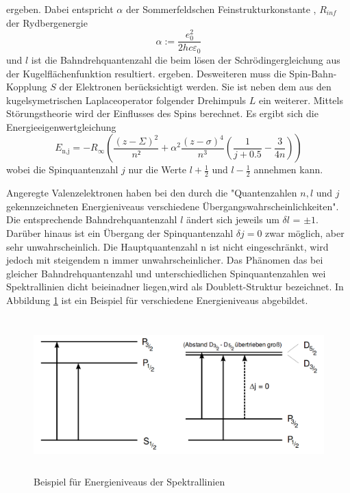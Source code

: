ergeben. Dabei entspricht $\alpha$ der Sommerfeldschen Feinstrukturkonstante , $R_{inf}$ der Rydbergenergie
\begin{equation}
  \alpha := \frac{e_0^2}{2 h c \varepsilon_0}
  \label{eqn:alpha}
\end{equation}
und $l$ ist die Bahndrehquantenzahl die beim lösen der Schrödingergleichung aus der Kugelflächenfunktion resultiert.
ergeben. Desweiteren muss die Spin-Bahn-Kopplung $S$ der Elektronen berücksichtigt werden. Sie ist neben dem aus den kugelsymetrischen Laplaceoperator folgender Drehimpuls $L$ ein weiterer. Mittels Störungstheorie wird der Einflusses des Spins berechnet. Es ergibt sich die Energieeigenwertgleichung
\begin{equation}
  E_\text{n,j} = -R_{\infty}\left( \frac{(z - \Sigma)^2}{n²} + \alpha^2 \frac{(z - \sigma)^4}{n^3} \left( \frac{1}{j + 0.5} - \frac{3}{4n} \right) \right)
  \label{<++>}
\end{equation}
wobei die Spinquantenzahl $j$ nur die Werte $l + \frac{1}{2}$ und $l - \frac{1}{2}$ annehmen kann.

Angeregte Valenzelektronen haben bei den durch die "Quantenzahlen $n ,l$ und $j$ gekennzeichneten Energieniveaus verschiedene Übergangswahrscheinlichkeiten".	Die entsprechende Bahndrehquantenzahl $l$ ändert sich jeweils um $\delta l$ = $\pm 1$. Darüber hinaus ist ein Übergang der Spinquantenzahl $\delta j = 0$ zwar möglich, aber sehr unwahrscheinlich. Die Hauptquantenzahl n ist nicht eingeschränkt, wird jedoch mit steigendem n immer unwahrscheinlicher. Das Phänomen das bei gleicher Bahndrehquantenzahl und unterschiedlichen Spinquantenzahlen wei Spektrallinien dicht beieinadner liegen,wird als Doublett-Struktur bezeichnet. In Abbildung \ref{fig:ene} ist ein Beispiel für verschiedene Energieniveaus abgebildet.
\begin{figure}
  \centering
  \includegraphics[height=6cm]{picture/eniv.png}
  \caption{Beispiel für Energieniveaus der Spektrallinien \cite{sample}}
  \label{fig:ene}
\end{figure}

